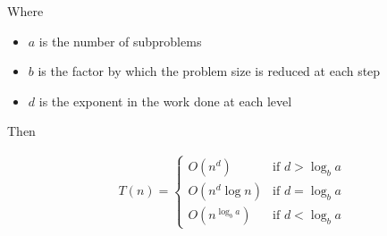 \documentclass[12pt]{extarticle}
\begin{document}
Where
\begin{itemize}
    \item $a$ is the number of subproblems
    \item $b$ is the factor by which the problem size is reduced at each step
    \item $d$ is the exponent in the work done at each level
\end{itemize}

Then

\begin{align*}
    T(n) = \begin{cases}
               O(n^d)          & \text{if } d > \log_b a \\
               O(n^d \log n)   & \text{if } d = \log_b a \\
               O(n^{\log_b a}) & \text{if } d < \log_b a
           \end{cases}
\end{align*}
\end{document}
